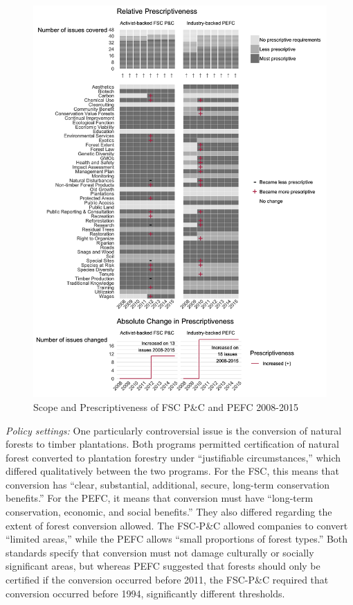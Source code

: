 \documentclass[
      12pt,
            Review ]{article}
\begin{document}
\begin{figure}
\centering
\includegraphics{FSC-PEFC-1.png}
\caption{Scope and Prescriptiveness of FSC P\&C and PEFC 2008-2015}
\end{figure}

\emph{Policy settings:} One particularly controversial issue is the conversion of natural forests to timber plantations. Both programs permitted certification of natural forest converted to plantation forestry under ``justifiable circumstances,'' which differed qualitatively between the two programs. For the FSC, this means that conversion has ``clear, substantial, additional, secure, long-term conservation benefits.'' For the PEFC, it means that conversion must have ``long-term conservation, economic, and social benefits.'' They also differed regarding the extent of forest conversion allowed. The FSC-P\&C allowed companies to convert ``limited areas,'' while the PEFC allows ``small proportions of forest types.'' Both standards specify that conversion must not damage culturally or socially significant areas, but whereas PEFC suggested that forests should only be certified if the conversion occurred before 2011, the FSC-P\&C required that conversion occurred before 1994, significantly different thresholds.
\end{document}
